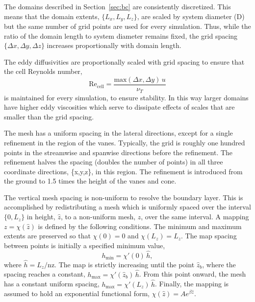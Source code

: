 %
%
The domains described in Section~\ref{sec:bc} are consistently
discretized. This means that the domain extents, $\{L_x,L_y,L_z\}$, are
scaled by system diameter (D) but the same number of grid points are
used for every simulation. Thus, while the ratio of the domain length to
system diameter remains fixed, the grid spacing $\{\Delta x,\Delta
y,\Delta z\}$ increases proportionally with domain length.  

The eddy diffusivities are proportionally scaled with grid spacing to
ensure that the cell Reynolds number, 
\begin{equation}
 \text{Re}_\text{cell} = \frac{\text{max}(\Delta x,\Delta y) \, u}{\nu_T}
\end{equation} 
is maintained for every simulation, to ensure stability. In this way
 larger domains have higher eddy viscosities which serve to dissipate
 effects of scales that are smaller than the grid spacing. 

The mesh has a uniform spacing in the lateral directions, except for a
single refinement in the region of the vanes. Typically, the grid is 
roughly one hundred points in the streamwise and spanwise directions
before the refinement. The refinement halves the spacing (doubles the
number of points) in all three coordinate directions, \{x,y,z\}, in this
region. The refinement is introduced from the ground to 1.5 times the
height of the vanes and cone.

%
%
%
%
%

The vertical mesh spacing is non-uniform to resolve the boundary
layer. This is accomplished by redistributing a mesh which is uniformly
spaced over the interval $\{0,L_z\}$ in height, $\hat z$, to a
non-uniform mesh, $z$, over the same interval.  
A mapping $z = \chi(\hat z)$ is defined by the following conditions.  
The minimum and maximum extents are preserved so that $ \chi(0) = 0 $
and $ \chi(L_z) = L_z $.  
The map spacing between points is initially a specified minimum value, 
\begin{equation}
  h_{\text{min}} = \chi'(0) \, \hat h,
\end{equation}
where $\hat h = L_z/\text{nz}$. The map is strictly increasing until the 
point $\hat z_b$, where the spacing reaches a constant, 
$h_{\text{max}} = \chi'(\hat z_b) \, \hat h$. 
From this point onward, the mesh has a constant uniform spacing,  
$  h_{\text{max}} = \chi'(L_z) \, \hat h$. 
%
Finally, the mapping is assumed to hold an exponential functional form, 
$  \chi(\hat z) = A e^{\beta \hat z}$.

